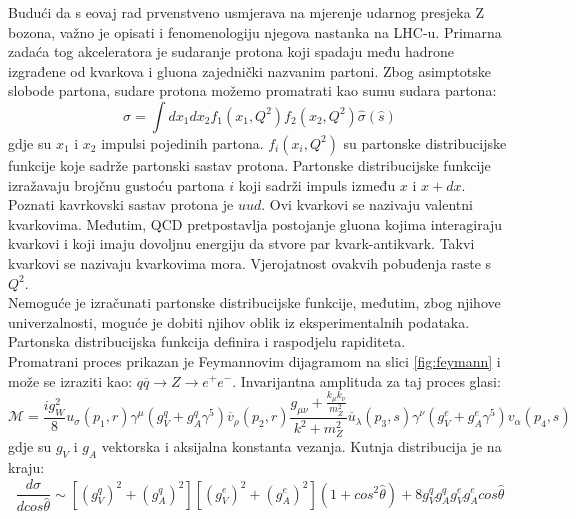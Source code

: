 \documentclass[a4paper,12pt]{report}
\begin{document}
Budući da s eovaj rad prvenstveno usmjerava na mjerenje udarnog presjeka Z bozona, važno je opisati i fenomenologiju njegova nastanka na LHC-u. Primarna zadaća tog akceleratora je sudaranje protona koji spadaju među hadrone izgrađene od kvarkova i gluona zajednički nazvanim partoni. Zbog asimptotske slobode partona, sudare protona možemo promatrati kao sumu sudara partona:
\begin{equation}
 \sigma=\int dx_1dx_2 f_1(x_1,Q^2) f_2(x_2,Q^2) \hat{\sigma} (\hat{s})
\label{equ:parton}
\end{equation}
gdje su $x_1$ i $x_2$ impulsi pojedinih partona. $f_i(x_i,Q^2)$ su partonske distribucijske funkcije koje sadrže partonski sastav protona. Partonske distribucijske funkcije izražavaju brojčnu gustoću partona $i$ koji sadrži impuls između $x$ i $x+dx$. Poznati kavrkovski sastav protona je $uud$. Ovi kvarkovi se nazivaju valentni kvarkovima. Međutim, QCD pretpostavlja postojanje gluona kojima interagiraju kvarkovi i koji imaju dovoljnu energiju da stvore par kvark-antikvark. Takvi kvarkovi se nazivaju kvarkovima mora. Vjerojatnost ovakvih pobuđenja raste s $Q^2$.\\
Nemoguće je izračunati partonske distribucijske funkcije, međutim, zbog njihove univerzalnosti, moguće je dobiti njihov oblik iz eksperimentalnih podataka. Partonska distribucijska funkcija definira i raspodjelu rapiditeta.\\
Promatrani proces prikazan je Feymannovim dijagramom na slici \ref{fig:feymann} i može se izraziti kao: $q\overline{q} \rightarrow Z \rightarrow e^+e^-$. Invarijantna amplituda za taj proces glasi:
\begin{equation}                                                                                                                                                                                                      
\mathcal{M}=\frac{ig_W^2}{8}u_{\sigma}(p_1,r)\gamma^{\mu}(g_V^q+g_A^q\gamma^5)\overline{v}_{\rho}(p_2,r)\frac{g_{\mu\nu}+\frac{k_{\mu}k_{\nu}}{m_Z^2}}{k^2+m_Z^2}   \overline{u}_{\lambda}(p_3,s)\gamma^{\nu}(g_V^e+g_A^e\gamma^5) v_{\alpha}(p_4,s)
\label{equ:amplituda}                                                                                                                                                                                   \end{equation}
gdje su $g_V$ i $g_A$ vektorska i aksijalna konstanta vezanja.
Kutnja distribucija je na kraju:
\begin{equation}
 \frac{d\hat{\sigma}}{d cos\hat{\theta}} \sim [(g_V^q)^2+(g_A^q)^2] [(g_V^e)^2+(g_A^e)^2](1+cos^2\hat{\theta})+8 g_V^q g_A^q g_V^e g_A^e cos \hat{\theta}
\end{equation}
\end{document}
